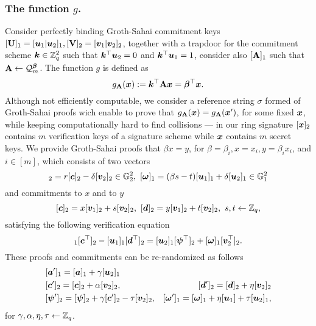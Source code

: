 \subsubsection{The function $g$.} Consider perfectly binding Groth-Sahai commitment keys $[\mathbf{{U}}]_1=[{\boldsymbol{u}}_1|{\boldsymbol{u}}_2]_1,[\mathbf{{V}}]_2 = [{\boldsymbol{v}}_1|{\boldsymbol{v}}_2]_2$, together with a trapdoor for the commitment scheme ${\boldsymbol{k}}\in\mathbb{Z}_q^2$ such that ${\boldsymbol{k}}^\top{\boldsymbol{u}}_2=0$ and ${\boldsymbol{k}}^\top{\boldsymbol{u}}_1=1$, consider also $[\mathbf{{A}}]_1$ such that $\mathbf{{A}}\gets\mathcal{Q}_m^{\boldsymbol{\beta}}$. The function $g$ is defined as
$$
g_{\mathbf{{A}}}({\boldsymbol{x}}):= {\boldsymbol{k}}^\top\mathbf{{A}}{\boldsymbol{x}}={\boldsymbol{\beta}}^\top{\boldsymbol{x}}.
$$
Although not efficiently computable, we consider a reference string $\sigma$ formed of Groth-Sahai proofs wich enable to prove that
 $g_{\mathbf{{A}}}({\boldsymbol{x}}) = g_{\mathbf{{A}}}({\boldsymbol{x}}')$, for some fixed ${\boldsymbol{x}}$, while keeping computationally hard to find collisions --- in our ring signature $[{\boldsymbol{x}}]_2$ contains $m$ verification keys of a signature scheme while ${\boldsymbol{x}}$ contains $m$ secret keys.
We provide Groth-Sahai proofs that $\beta x=y$, for $\beta=\beta_i,x=x_i,y=\beta_ix_i$, and $i\in[m]$, which consists of two vectors
\begin{equation}
[\vecb{\psi}]_2=r[\vecb{c}]_2-\delta[\vecb{v}_2]_2\in\GG_2^2,\ [\vecb{\omega}]_1 =(\beta s-t)[\vecb{u}_1]_1+\delta[\vecb{u}_2]_1\in\GG_1^2
\label{eq:wi-proofs}
\end{equation}
and commitments to $x$ and to $y$
$$
[{\boldsymbol{c}}]_2= x[{\boldsymbol{v}}_1]_2+s[{\boldsymbol{v}}_2]_2,\ [{\boldsymbol{d}}]_2 =y[{\boldsymbol{v}}_1]_2 + t[{\boldsymbol{v}}_2]_2,\ s,t\gets\mathbb{Z}_q,
$$
satisfying the following verification equation
\begin{equation}
[\vecb{a}]_1[\vecb{c}^\top]_2-[\vecb{u}_1]_1[\vecb{d}^\top]_2 =[\vecb{u}_2]_1[\vecb{\psi}^\top]_2+[\vecb{\omega}]_1[\vecb{v}^\top_2]_2.
\label{eq:wi-verif}
\end{equation}
These proofs and commitments can be re-randomized as follows
\begin{align}
&[{\boldsymbol{a}}']_1 = [{\boldsymbol{a}}]_1 + \gamma[{\boldsymbol{u}}_2]_1 \nonumber\\
&[{\boldsymbol{c}}']_2= [{\boldsymbol{c}}]_2 + \alpha[{\boldsymbol{v}}_2]_2, &[{\boldsymbol{d}}']_2 =[{\boldsymbol{d}}]_2 + \eta[{\boldsymbol{v}}_2]_2 \nonumber\\
&[{\boldsymbol{\psi}}']_2=[{\boldsymbol{\psi}}]_2+\gamma[{\boldsymbol{c}}']_2-\tau[{\boldsymbol{v}}_2]_2, & [{\boldsymbol{\omega}}']_1 =[{\boldsymbol{\omega}}]_1+\eta[{\boldsymbol{u}}_1]+\tau[{\boldsymbol{u}}_2]_1,
\end{align}
for $\gamma,\alpha,\eta,\tau\gets\mathbb{Z}_q$.

